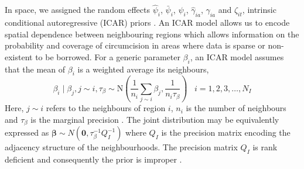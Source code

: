 \documentclass{article}
\begin{document}
\begin{appendix}
In space, we assigned the random effects $\hat{\psi}_i$, $\bar{\psi}_i$, $\psi_i$, $\hat{\gamma}_{ia}$, $\gamma_{ia}$ and $\zeta_{it}$, intrinsic conditional autoregressive (ICAR) priors \cite{besag1995conditional}. An ICAR model allows us to encode spatial dependence between neighbouring regions which allows information on the probability and coverage of circumcision in areas where data is sparse or non-existent to be borrowed. For a generic parameter $\beta_i$, an ICAR model assumes that the mean of $\beta_i$ is a weighted average its neighbours, 
\begin{equation*}
	\beta_i \;|\; \beta_{j}, j \sim i, \tau_{\beta} \sim \text{N}\left(\frac{1}{n_i} \sum_{j \sim i} \beta_j, \frac{1}{n_i\tau_{\beta}} \right) \;\;\; i = 1, 2, 3,\ldots, N_I
\end{equation*}
Here, $j \sim i$ refers to the neighbours of region $i$, $n_i$ is the number of neighbours and $\tau_{\beta}$ is the marginal precision \cite{rue2005gaussian}. The joint distribution may be equivalently expressed as $\boldsymbol{\beta} \sim N(\boldsymbol{0}, \tau_{\beta}^{-1}Q^{-1}_{I})$ where $Q_{I}$ is the precision matrix encoding the adjacency structure of the neighbourhoods. The precision matrix $Q_{I}$ is rank deficient and consequently the prior is improper \cite{rue2005gaussian}. 


\end{appendix}
\end{document}
